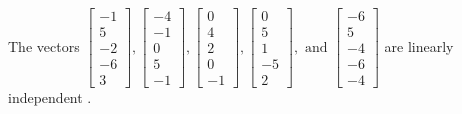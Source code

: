 \begin{exercise}
\begin{exerciseStatement}
  \end{exerciseStatement}
  \begin{exerciseAnswer}
   The vectors \(\left[\begin{array}{r}
-1 \\
5 \\
-2 \\
-6 \\
3
\end{array}\right] , \left[\begin{array}{r}
-4 \\
-1 \\
0 \\
5 \\
-1
\end{array}\right] , \left[\begin{array}{r}
0 \\
4 \\
2 \\
0 \\
-1
\end{array}\right] , \left[\begin{array}{r}
0 \\
5 \\
1 \\
-5 \\
2
\end{array}\right] , \text{ and } \left[\begin{array}{r}
-6 \\
5 \\
-4 \\
-6 \\
-4
\end{array}\right]\) are 
  	 linearly independent  .
  


  \end{exerciseAnswer}
\end{exercise}